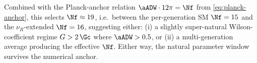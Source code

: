 Combined with the Planck-anchor relation
$\aADW \cdot 12\pi = \Nf$ from \eqref{eq:planck-anchor}, this
selects $\Nf \approx 19$, i.e.\ between the per-generation SM
$\Nf = 15$ and the $\nu_{R}$-extended $\Nf = 16$, suggesting
either: (i) a slightly super-natural Wilson-coefficient regime
$G > 2\,\Gc$ where $\aADW > 0.5$, or (ii) a multi-generation
average producing the effective $\Nf$. Either way, the natural
parameter window survives the numerical anchor.

